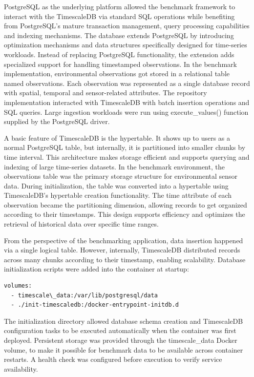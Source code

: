 PostgreSQL as the underlying platform allowed the benchmark framework to interact with the TimescaleDB via standard SQL operations while benefiting from PostgreSQL’s mature transaction management, query processing capabilities and indexing mechanisms. The database extends PostgreSQL by introducing optimization mechanisms and data structures specifically designed for time-series workloads. Instead of replacing PostgreSQL functionality, the extension adds specialized support for handling timestamped observations. In the benchmark implementation, environmental observations got stored in a relational table named observations. Each observation was represented as a single database record with spatial, temporal and sensor-related attributes. The repository implementation interacted with TimescaleDB with batch insertion operations and SQL queries. Large ingestion workloads were run using execute\_values() function supplied by the PostgreSQL driver.

A basic feature of TimescaleDB is the hypertable. It shows up to users as a normal PostgreSQL table, but internally, it is partitioned into smaller chunks by time interval. This architecture makes storage efficient and supports querying and indexing of large time-series datasets. In the benchmark environment, the observations table was the primary storage structure for environmental sensor data. During initialization, the table was converted into a hypertable using TimescaleDB’s hypertable creation functionality. The time attribute of each observation became the partitioning dimension, allowing records to get organized according to their timestamps. This design supports efficiency and optimizes the retrieval of historical data over specific time ranges. 

From the perspective of the benchmarking application, data insertion happened via a single logical table. However, internally, TimescaleDB distributed records across many chunks according to their timestamp, enabling scalability. Database initialization scripts were added into the container at startup:


\begin{verbatim}
volumes:
  - timescale\_data:/var/lib/postgresql/data
  - ./init-timescaledb:/docker-entrypoint-initdb.d
\end{verbatim}
The initialization directory allowed database schema creation and TimescaleDB configuration tasks to be executed automatically when the container was first deployed. Persistent storage was provided through the timescale\_data Docker volume, to make it possible for benchmark data to be available across container restarts. A health check was configured before execution to verify service availability. 



